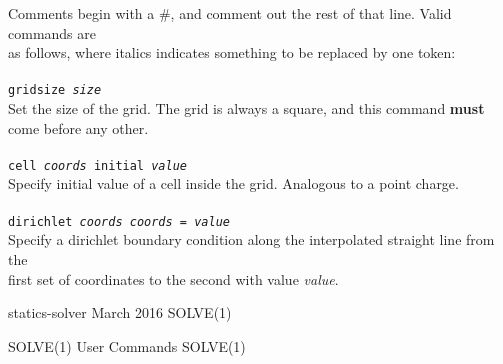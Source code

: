 \begin{tabbing}
\> Comments begin with a \#, and comment out the rest of that line. Valid commands are\\
\> as follows, where italics indicates something to be replaced by one token:\\
\\
	\> \texttt{gridsize \textit{size}}\\
	\> \> Set the size of the grid. The grid is always a square, and this command \textbf{must}\\
	\> \> come before any other.\\
	\\
	\> \texttt{cell \textit{coords} initial \textit{value}}\\
	\> \> Specify initial value of a cell inside the grid. Analogous to a point charge.\\
	\\
	\> \texttt{dirichlet \textit{coords} \textit{coords} = \textit{value}}\\
	\> \> Specify a dirichlet boundary condition along the interpolated straight line from the\\
	\> \> first set of coordinates to the second with value \textit{value}.\\
\end{tabbing}
\begin{flushleft}
	statics-solver
	\hfill March 2016 \hfill
	SOLVE(1)
\end{flushleft}
\clearpage
\begin{flushleft}
	SOLVE(1)
	\hfill User Commands \hfill
	SOLVE(1)
\end{flushleft}

